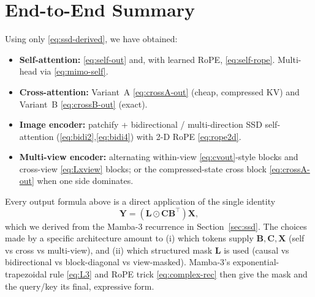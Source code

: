 \documentclass[11pt,a4paper]{article}
\begin{document}
\section{End-to-End Summary}

Using only \eqref{eq:ssd-derived}, we have obtained:

\begin{itemize}
  \item \textbf{Self-attention:} \eqref{eq:self-out} and, with
        learned RoPE, \eqref{eq:self-rope}. Multi-head via
        \eqref{eq:mimo-self}.
  \item \textbf{Cross-attention:} Variant~A \eqref{eq:crossA-out}
        (cheap, compressed KV) and Variant~B \eqref{eq:crossB-out}
        (exact).
  \item \textbf{Image encoder:} patchify + bidirectional /
        multi-direction SSD self-attention
        (\eqref{eq:bidi2},\eqref{eq:bidi4}) with 2-D RoPE
        \eqref{eq:rope2d}.
  \item \textbf{Multi-view encoder:} alternating within-view
        \eqref{eq:cvout}-style blocks and cross-view
        \eqref{eq:Lxview} blocks; or the compressed-state cross
        block \eqref{eq:crossA-out} when one side dominates.
\end{itemize}

Every output formula above is a direct application of the single
identity
\begin{equation*}
  \bm{Y} = (\bm{L}\odot\bm{C}\bm{B}^\top)\bm{X},
\end{equation*}
which we derived from the Mamba-3 recurrence in
Section~\ref{sec:ssd}. The choices made by a specific architecture
amount to (i) which tokens supply $\bm{B},\bm{C},\bm{X}$ (self vs
cross vs multi-view), and (ii) which structured mask $\bm{L}$ is used
(causal vs bidirectional vs block-diagonal vs view-masked). Mamba-3's
exponential-trapezoidal rule \eqref{eq:L3} and RoPE trick
\eqref{eq:complex-rec} then give the mask and the query/key its final,
expressive form.



\end{document}
